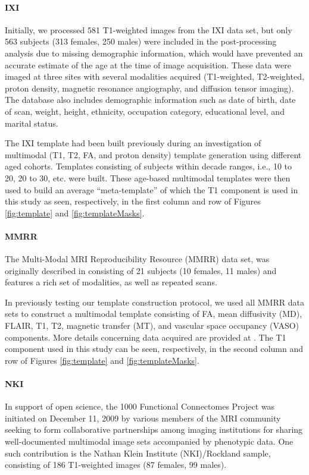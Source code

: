 \paragraph{IXI}
Initially, we processed 581 T1-weighted images from the IXI
 data set, but only 563 subjects
(313 females, 250 males) were included in the post-processing analysis due to 
missing demographic information, which would have prevented an accurate estimate of
the age at the time of image acquisition.  These data were
imaged at three sites 
with several modalities acquired (T1-weighted, T2-weighted, proton density, magnetic 
resonance angiography, and diffusion tensor imaging).  The 
database also includes demographic information such as date of birth, date
of scan, weight,
height, ethnicity, occupation category, educational level, and marital status.

The IXI template had been built previously during an investigation of  multimodal 
(T1, T2, FA, and proton density) template generation using different 
aged cohorts.  Templates consisting of subjects
within decade ranges, i.e., 10 to 20, 20 to 30, etc. were built.  These
age-based multimodal templates were then used to build an average ``meta-template'' of which 
the T1 component is used in this study as seen, respectively, in the first column and row of 
Figures \ref{fig:template} and \ref{fig:templateMasks}.

\paragraph{MMRR}
The Multi-Modal MRI Reproducibility Resource (MMRR)
data set, was originally described in \cite{landman2011} consisting of 
21 subjects (10 females, 11 males) and features a rich set of modalities, 
as well as repeated scans.

In previously testing our template construction protocol, we used all 
MMRR data sets to construct a multimodal template consisting of
FA, mean diffusivity (MD), FLAIR, T1, T2, magnetic transfer (MT), and 
vascular space occupancy (VASO) components.  More details concerning 
data acquired are provided at \cite{landman2011}.  The T1 component used in 
this study can be seen, respectively, in the second column and row of 
Figures \ref{fig:template} and \ref{fig:templateMasks}.

\paragraph{NKI}
In support of open science, the 1000 Functional Connectomes Project
was initiated on December 11, 2009 by various members of the MRI community
seeking to form collaborative partnerships among imaging institutions for
sharing well-documented multimodal image sets accompanied by phenotypic data.
One such contribution is the Nathan Klein Institute (NKI)/Rockland sample,
consisting of 186 T1-weighted
images (87 females, 99 males).%

